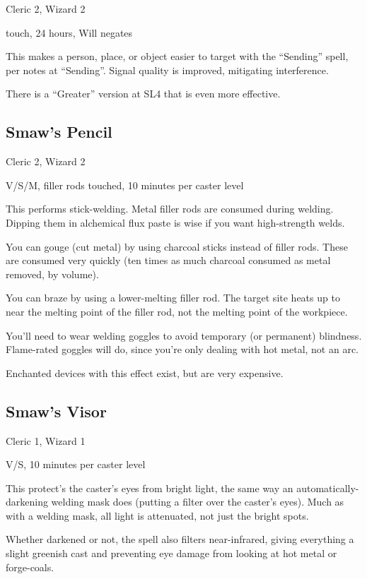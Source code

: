 Cleric 2, Wizard 2

touch, 24 hours, Will negates

This makes a person, place, or object easier to target with the ``Sending''
spell, per notes at ``Sending''. Signal quality is improved, mitigating
interference.

There is a ``Greater'' version at SL4 that is even more effective.
%

%
\subsection{Smaw's Pencil}

Cleric 2, Wizard 2

V/S/M, filler rods touched, 10 minutes per caster level

This performs stick-welding. Metal filler rods are consumed during welding.
Dipping them in alchemical flux paste is wise if you want high-strength
welds.

You can gouge (cut metal) by using charcoal sticks instead of filler rods.
These are consumed very quickly (ten times as much charcoal consumed as
metal removed, by volume).

You can braze by using a lower-melting filler rod. The target site heats up
to near the melting point of the filler rod, not the melting point of the
workpiece.

You'll need to wear welding goggles to avoid temporary (or permanent)
blindness. Flame-rated goggles will do, since you're only dealing with hot
metal, not an arc.

Enchanted devices with this effect exist, but are very expensive.
%

%
\subsection{Smaw's Visor}

Cleric 1, Wizard 1

V/S, 10 minutes per caster level

This protect's the caster's eyes from bright light, the same way an
automatically-darkening welding mask does (putting a filter over the
caster's eyes). Much as with a welding mask, all light is attenuated, not
just the bright spots.

Whether darkened or not, the spell also filters near-infrared, giving
everything a slight greenish cast and preventing eye damage from looking
at hot metal or forge-coals.

